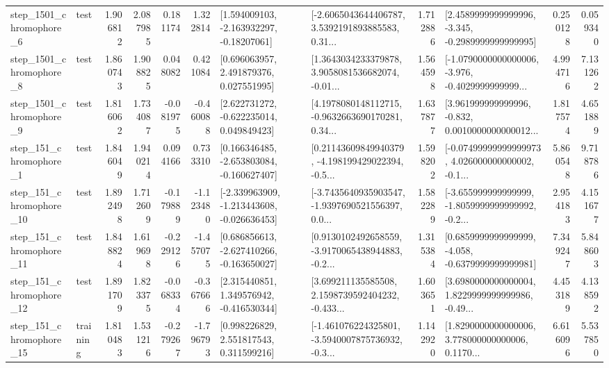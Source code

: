 \begin{tabular}{llrrrrllrlrr}
  step\_1501\_chromophore\_6 &      test &      1.906812 &    2.087985 &      0.181174 &  1.322814 &    [1.594009103, -2.163932297, -0.18207061] &  [-2.6065043644406787, 3.5392191893885583, 0.31... &       1.712886 &  [2.4589999999999996, -3.345, -0.2989999999999995] &            0.250128 &          0.059340 \\
  step\_1501\_chromophore\_8 &      test &      1.860743 &    1.908825 &      0.048082 &  0.421084 &     [0.696063957, 2.491879376, 0.027551995] &  [1.3643034233379878, 3.9058081536682074, -0.01... &       1.564598 &  [-1.0790000000000006, -3.976, -0.4029999999999... &            4.994716 &          7.131262 \\
  step\_1501\_chromophore\_9 &      test &      1.816062 &    1.734087 &     -0.081975 & -0.460088 &    [2.622731272, -0.622235014, 0.049849423] &  [4.1978080148112715, -0.9632663690170281, 0.34... &       1.637877 &  [3.961999999999996, -0.832, 0.0010000000000012... &            1.817574 &          4.651889 \\
   step\_151\_chromophore\_1 &      test &      1.846049 &    1.940214 &      0.094166 &  0.733310 &   [0.166346485, -2.653803084, -0.160627407] &  [0.21143609849940379, -4.198199429022394, -0.5... &       1.598202 &  [-0.07499999999999973, 4.026000000000002, -0.1... &            5.860548 &          9.718786 \\
  step\_151\_chromophore\_10 &      test &      1.892498 &    1.712609 &     -0.179889 & -1.123480 &  [-2.339963909, -1.213443608, -0.026636453] &  [-3.7435640935903547, -1.9397690521556397, 0.0... &       1.582289 &  [-3.655999999999999, -1.8059999999999992, -0.2... &            2.954183 &          4.151677 \\
  step\_151\_chromophore\_11 &      test &      1.848824 &    1.619698 &     -0.229126 & -1.457075 &   [0.686856613, -2.627410266, -0.163650027] &  [0.9130102492658559, -3.9170065438944883, -0.2... &       1.315384 &  [0.6859999999999999, -4.058, -0.6379999999999981] &            7.349247 &          5.848603 \\
  step\_151\_chromophore\_12 &      test &      1.891709 &    1.823375 &     -0.068334 & -0.367666 &    [2.315440851, 1.349576942, -0.416530344] &  [3.699211135585508, 2.1598739592404232, -0.433... &       1.603651 &  [3.6980000000000004, 1.8229999999999986, -0.49... &            4.453189 &          4.138592 \\
  step\_151\_chromophore\_15 &  training &      1.810483 &    1.531216 &     -0.279267 & -1.796793 &     [0.998226829, 2.551817543, 0.311599216] &  [-1.461076224325801, -3.5940007875736932, -0.3... &       1.142920 &  [1.8290000000000006, 3.778000000000006, 0.1170... &            6.616096 &          5.537850 \\

\end{tabular}
